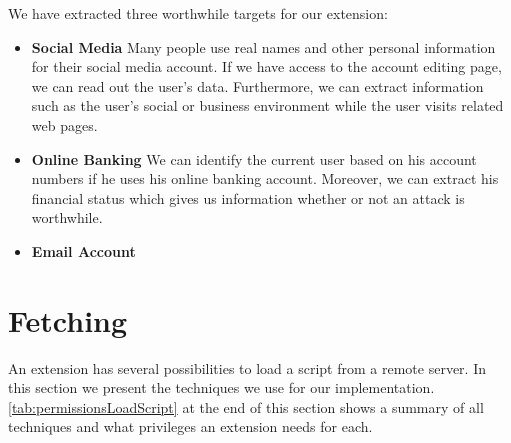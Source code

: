 	We have extracted three worthwhile targets for our extension:
	\begin{itemize}
		\item \textbf{Social Media} Many people use real names and other personal information for their social media account. If we have access to the account editing page, we can read out the user's data. Furthermore, we can extract information such as the user's social or business environment while the user visits related web pages.
		\item \textbf{Online Banking} We can identify the current user based on his account numbers if he uses his online banking account. Moreover, we can extract his financial status which gives us information whether or not an attack is worthwhile.
		\item \textbf{Email Account} 
	\end{itemize}
	
	
	
	

	
\section{Fetching}
\label{sec:fetching}
	
	An extension has several possibilities to load a script from a remote server. In this section we present the techniques we use for our implementation. \autoref{tab:permissionsLoadScript} at the end of this section shows a summary of all techniques and what privileges an extension needs for each. 
		
